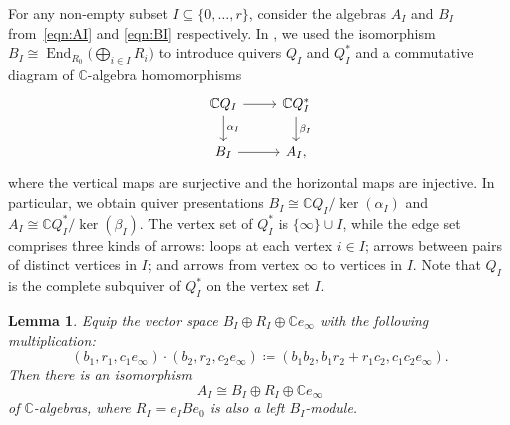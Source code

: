 \documentclass[pdftex]{sigma}%
\newtheorem{Lemma}[Theorem]{Lemma}
\newcommand{\SC}{\mathbb{C}} %
\newcommand{\C}{\SC} %
\newcommand{\End}{\operatorname{End}}
\newcommand{\PiGamma}{B}
\newcommand{\PiQ}{A}
\numberwithin{equation}{section}
\begin{document}
For any non-empty subset $I \subseteq \{0,\dots,r\}$, consider the algebras $\PiQ_I$ and $\PiGamma_I$ from~\eqref{eqn:AI} and \eqref{eqn:BI} respectively.
 In \cite[Proposition~3.3]{craw2019punctual}, we used the isomorphism $\PiGamma_I\cong \End_{R_0}\big(\bigoplus_{i\in I} R_i\big)$ to introduce quivers $Q_I$ and $Q_I^*$ and a commutative diagram of $\C$-algebra homomorphisms
 \begin{equation*}
\begin{tikzcd}
 \C Q_I \ar[d,"\alpha_I"]\ar[r] & \C Q_I^* \ar[d,"\beta_I"] \\
 \PiGamma_I \ar[r] & \PiQ_I,
 \end{tikzcd}
 \end{equation*}
 where the vertical maps are surjective and the horizontal maps are injective. In particular, we obtain quiver presentations $\PiGamma_I\cong \C Q_I/\ker(\alpha_I)$ and $\PiQ_I\cong \C Q_I^*/\ker(\beta_I)$. The vertex set of $Q^*_I$ is $\{\infty\}\cup I$, while the
edge set
comprises three kinds of arrows: loops at each vertex $i\in I$; arrows between pairs of
distinct vertices in $I$; and
arrows
from vertex $\infty$ to vertices in $I$.
Note that $Q_I$ is the complete
subquiver of $Q_I^*$ on the vertex set $I$.


\begin{Lemma}\label{lem_general_I}
Equip the vector space $\PiGamma_I \oplus R_I \oplus \SC e_\infty$ with the following multiplication:
\[ (b_1,r_1,c_1e_\infty) \cdot (b_2,r_2,c_2e_\infty) \coloneqq (b_1b_2,b_1r_2+r_1c_2,c_1c_2e_\infty). \]
Then there is an isomorphism
\begin{equation*}
\PiQ_I \cong \PiGamma_I \oplus R_I \oplus \SC e_\infty
\end{equation*}
of $\SC$-algebras, where $R_I=e_I \PiGamma e_0$ is also a left $\PiGamma_I$-module.
\end{Lemma}
\end{document}

